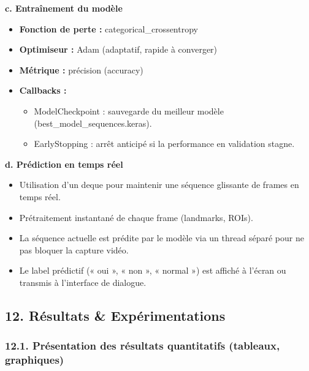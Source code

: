 \documentclass[
]{article}
\begin{document}
\textbf{c. Entraînement du modèle}

\begin{itemize}
\item
  \textbf{Fonction de perte :} categorical\_crossentropy
\item
  \textbf{Optimiseur :} Adam (adaptatif, rapide à converger)
\item
  \textbf{Métrique :} précision (accuracy)
\item
  \textbf{Callbacks :\\
  }

  \begin{itemize}
  \item
    ModelCheckpoint : sauvegarde du meilleur modèle (best\_model\_sequences.keras).
  \item
    EarlyStopping : arrêt anticipé si la performance en validation stagne.
  \end{itemize}
\end{itemize}

\textbf{d. Prédiction en temps réel}

\begin{itemize}
\item
  Utilisation d'un deque pour maintenir une séquence glissante de frames en temps réel.
\item
  Prétraitement instantané de chaque frame (landmarks, ROIs).
\item
  La séquence actuelle est prédite par le modèle via un thread séparé pour ne pas bloquer la capture vidéo.
\item
  Le label prédictif (« oui », « non », « normal ») est affiché à l'écran ou transmis à l'interface de dialogue.
\end{itemize}

\hypertarget{ruxe9sultats-expuxe9rimentations}{%
\subsection{12. Résultats \& Expérimentations}\label{ruxe9sultats-expuxe9rimentations}}

\hypertarget{pruxe9sentation-des-ruxe9sultats-quantitatifs-tableaux-graphiques}{%
\subsubsection{12.1. Présentation des résultats quantitatifs (tableaux, graphiques)}\label{pruxe9sentation-des-ruxe9sultats-quantitatifs-tableaux-graphiques}}
\end{document}
